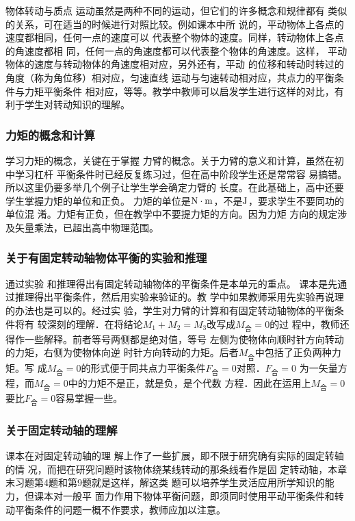 物体转动与质点
运动虽然是两种不同的运动，但它们的许多概念和规律都有
类似的关系，可在适当的时候进行对照比较。例如课本中所
说的，平动物体上各点的速度都相同，任何一点的速度可以
代表整个物体的速度。同样，转动物体上各点的角速度都相
同，任何一点的角速度都可以代表整个物体的角速度。这样，
平动物体的速度与转动物体的角速度相对应，另外还有，平动
的位移和转动时转过的角度（称为角位移）相对应，匀速直线
运动与匀速转动相对应，共点力的平衡条件与力矩平衡条件
相对应，等等。教学中教师可以启发学生进行这样的对比，有
利于学生对转动知识的理解。

\subsubsection{力矩的概念和计算}
学习力矩的概念，关键在于掌握
力臂的概念。关于力臂的意义和计算，虽然在初中学习杠杆
平衡条件时已经反复练习过，但在高中阶段学生还是常常容
易搞错。所以这里仍要多举几个例子让学生学会确定力臂的
长度。在此基础上，高中还要学生掌握力矩的单位和正负。
力矩的单位是${\rm N\cdot m}$，不是${\rm J}$，要求学生不要同功的单位混
淆。力矩有正负，但在教学中不要提力矩的方向。因为力矩
方向的规定涉及矢量乘法，已超出高中物理范围。

\subsubsection{关于有固定转动轴物体平衡的实验和推理}

通过实验
和推理得出有固定转动轴物体的平衡条件是本单元的重点。
课本是先通过推理得出平衡条件，然后用实验来验证的。教
学中如果教师采用先实验再说理的办法也是可以的。经过实
验，学生对力臂的计算和有固定转动轴物体的平衡条件将有
较深刻的理解．在将结论$M_1+M_2=M_3$改写成$M_{\text{合}}=0$的过
程中，教师还得作一些解释。前者等号两侧都是绝对值，等号
左侧为使物体向顺时针方向转动的力矩，右侧为使物体向逆
时针方向转动的力矩。后者$M_{\text{合}}$中包括了正负两种力矩。写
成$M_{\text{合}}=0$的形式便于同共点力平衡条件$F_{\text{合}}=0$对照．$F_{\text{合}}=0$
为一矢量方程，而$M_{\text{合}}=0$中的力矩不是正，就是负，是个代数
方程．因此在运用上$M_{\text{合}}=0$要比$F_{\text{合}}=0$容易掌握一些。

\subsubsection{关于固定转动轴的理解}

课本在对固定转动轴的理
解上作了一些扩展，即不限于研究确有实际的固定转轴的情
况，而把在研究问题时该物体绕某线转动的那条线看作是固
定转动轴，本章末习题第4题和第9题就是这样，解这类
题可以培养学生灵活应用所学知识的能力，但课本对一般平
面力作用下物体平衡问题，即须同时使用平动平衡条件和转
动平衡条件的问题一概不作要求，教师应加以注意。

